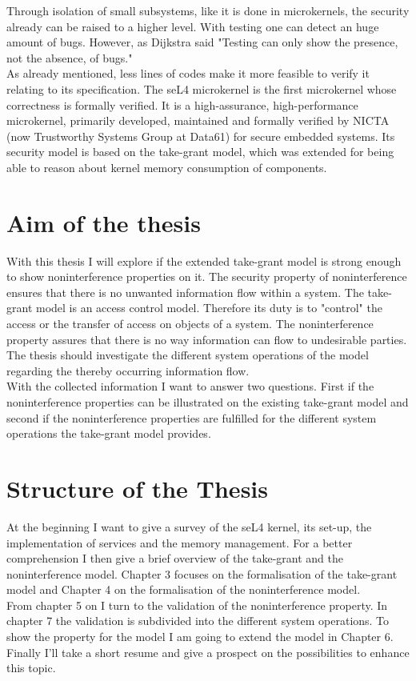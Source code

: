 Through isolation of small subsystems, like it is done in microkernels, the security already can be raised to a higher level. With testing one can detect an huge amount of bugs. However, as Dijkstra said "Testing can only show the presence, not the absence, of bugs." \cite{EngTec} \\
As already mentioned, less lines of codes make it more feasible to verify it relating to its specification. 
The seL4 microkernel is the first microkernel whose correctness is formally verified. It is a high-assurance, high-performance microkernel, primarily developed, maintained and formally verified by NICTA (now Trustworthy Systems Group at Data61) for secure embedded systems. Its security model is based on the take-grant model, which was extended for being able to reason about kernel memory consumption of components. 
	\section{Aim of the thesis}
	With this thesis I will explore if the extended take-grant model is strong enough to show noninterference properties on it. The security property of noninterference ensures that there is no unwanted information flow within a system. The take-grant model is an access control model. Therefore its duty is to "control" the access or the transfer of access on objects of a system. The noninterference property assures that there is no way information can flow to undesirable parties. \\
The thesis should investigate the different system operations of the model regarding the thereby occurring information flow. \\
With the collected information I want to answer two questions. First if the noninterference properties can be illustrated on the existing take-grant model and second if the noninterference properties are fulfilled for the different system operations the take-grant model provides. 
\section{Structure of the Thesis}
At the beginning I want to give a survey of the seL4 kernel, its set-up, the implementation of services and the memory management. For a better comprehension I then give a brief overview of the take-grant and the noninterference model. 
Chapter 3 focuses on the formalisation of the take-grant model and Chapter 4 on the formalisation of the noninterference model. \\
From chapter 5 on I turn to the validation of the noninterference property. In chapter 7 the validation is subdivided into the different system operations. To show the property for the model I am going to extend the model in Chapter 6. Finally I'll take a short resume and give a prospect on the possibilities to enhance this topic.